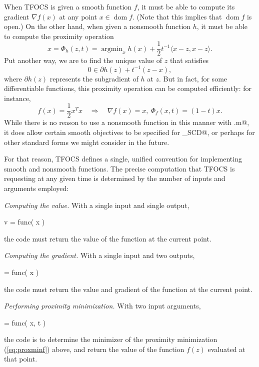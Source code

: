 \documentclass{article}
\DeclareMathOperator*{\argmin}{argmin}
\newcommand\thalf{{\textstyle\frac{1}{2}}}
\newcommand{\<}{\langle}
\renewcommand{\>}{\rangle}
\newcommand\dom{\operatorname{\textrm{dom}}}
\begin{document}
When TFOCS is given a smooth function $f$, it must be able
to compute its gradient $\nabla f(x)$ at any point $x\in\dom f$.
(Note that this implies that $\dom f$ is open.) On the other hand,
when given a nonsmooth function $h$, it must 
be able to compute the proximity operation
\begin{equation}
	\label{eq:proxminf}
	x = \Phi_h(z,t) = \argmin_x h(x) + \thalf t^{-1} \< x - z, x - z \>.
\end{equation}
Put another way, we are to find the unique value of $z$ that satisfies
\begin{equation}
	0 \in \partial h(z) + t^{-1} ( z - x ),
\end{equation}
where $\partial h(z)$ represents the subgradient of $h$ at $z$.
But in fact, for some differentiable functions, this proximity operation
can be computed efficiently: for instance,
\begin{equation}
	f(x)=\thalf x^Tx \quad\Longrightarrow\quad 
	\nabla f(x)=x, ~ \Phi_f(x,t)=(1-t)x.
\end{equation}
While there is no reason to use a nonsmooth function in this manner
with \verb@tfocs.m@, it does allow certain smooth objectives to be
specified for \verb@tfocs_SCD@, or perhaps for other standard forms
we might consider in the future. 

For that reason, TFOCS defines a 
single, unified convention for implementing smooth and
nonsmooth functions. 
The precise computation that TFOCS is requesting at any given time is
determined by the number of inputs and arguments employed:
\begin{trivlist}
\item \emph{Computing the value.} With a single input and single output,
\begin{code}
	v = func( x )
\end{code}
the code must return the value of the function at the current point.
\item \emph{Computing the gradient.} With a single input and two outputs, 
\begin{code}
	[ v, grad ] = func( x )
\end{code}
the code must return the value and gradient of the function at the
current point.
\item \emph{Performing proximity minimization.} With two input
arguments,
\begin{code}
	[ vz, z ] = func( x, t )
\end{code}
the code is to determine the minimizer \verb@z@ of the proximity 
minimization (\ref{eq:proxminf}) above, and return the value of the
function $f(z)$ evaluated at that point.
\end{trivlist}
\end{document}
